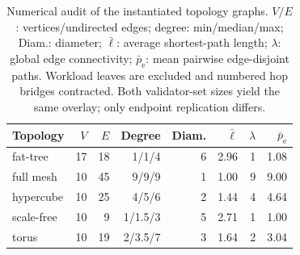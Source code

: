 \begin{table}[t]
\caption{Numerical audit of the instantiated topology graphs. $V/E$: vertices/undirected edges; degree: min/median/max; Diam.: diameter; $\bar{\ell}$: average shortest-path length; $\lambda$: global edge connectivity; $\bar{p}_{\mathrm{e}}$: mean pairwise edge-disjoint paths. Workload leaves are excluded and numbered hop bridges contracted. Both validator-set sizes yield the same overlay; only endpoint replication differs.}
\label{tab:topology_numeric_audit}
\centering
\TableFont
\setlength{\tabcolsep}{3.6pt}
\begin{tabular}{lrrrrrrr}
\toprule
Topology & $V$ & $E$ & Degree & Diam. & $\bar{\ell}$ & $\lambda$ & $\bar{p}_{\mathrm{e}}$ \\
\midrule
fat-tree & 17 & 18 & 1/1/4 & 6 & 2.96 & 1 & 1.08 \\
full mesh & 10 & 45 & 9/9/9 & 1 & 1.00 & 9 & 9.00 \\
hypercube & 10 & 25 & 4/5/6 & 2 & 1.44 & 4 & 4.64 \\
scale-free & 10 & 9 & 1/1.5/3 & 5 & 2.71 & 1 & 1.00 \\
torus & 10 & 19 & 2/3.5/7 & 3 & 1.64 & 2 & 3.04 \\
\bottomrule
\end{tabular}
\end{table}

